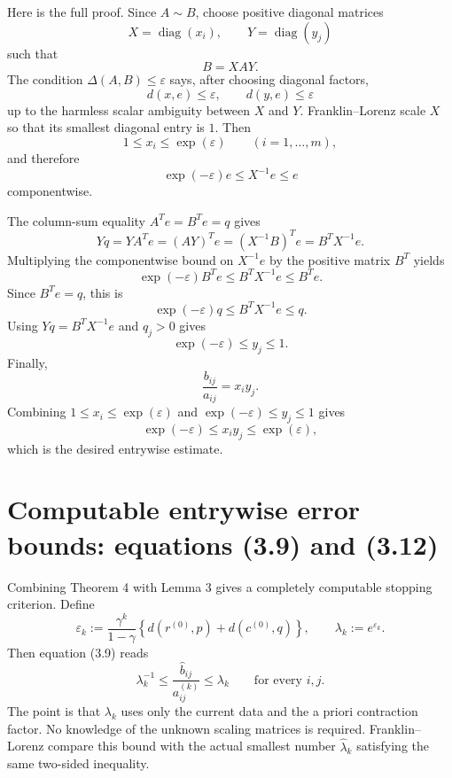 Here is the full proof.
Since $A\sim B$, choose positive diagonal matrices
\[
  X=\operatorname{diag}(x_i),\qquad Y=\operatorname{diag}(y_j)
\]
such that
\[
  B=XAY.
\]
The condition $\Delta(A,B)\le \varepsilon$ says, after choosing diagonal factors,
\[
  d(x,e)\le \varepsilon,
  \qquad
  d(y,e)\le \varepsilon
\]
up to the harmless scalar ambiguity between $X$ and $Y$.  Franklin--Lorenz scale
$X$ so that its smallest diagonal entry is $1$.  Then
\[
  1\le x_i\le \exp(\varepsilon)
  \qquad(i=1,\dots,m),
\]
and therefore
\[
  \exp(-\varepsilon)e\le X^{-1}e\le e
\]
componentwise.

The column-sum equality $A^Te=B^Te=q$ gives
\[
  Yq=YA^Te=(AY)^Te=(X^{-1}B)^Te=B^TX^{-1}e.
\]
Multiplying the componentwise bound on $X^{-1}e$ by the positive matrix $B^T$ yields
\[
  \exp(-\varepsilon)B^Te
  \le B^TX^{-1}e
  \le B^Te.
\]
Since $B^Te=q$, this is
\[
  \exp(-\varepsilon)q\le B^TX^{-1}e\le q.
\]
Using $Yq=B^TX^{-1}e$ and $q_j>0$ gives
\[
  \exp(-\varepsilon)\le y_j\le 1.
\]
Finally,
\[
  \frac{b_{ij}}{a_{ij}}=x_i y_j.
\]
Combining $1\le x_i\le \exp(\varepsilon)$ and
$\exp(-\varepsilon)\le y_j\le 1$ gives
\[
  \exp(-\varepsilon)\le x_i y_j\le \exp(\varepsilon),
\]
which is the desired entrywise estimate.


\section*{Computable entrywise error bounds: equations (3.9) and (3.12)}
Combining Theorem 4 with Lemma 3 gives a completely computable stopping
criterion.  Define
\[
  \varepsilon_k:=
  \frac{\gamma^k}{1-\gamma}
  \left\{d(r^{(0)},p)+d(c^{(0)},q)\right\},
  \qquad
  \lambda_k:=e^{\varepsilon_k}.
  \tag{3.12}
\]
Then equation (3.9) reads
\[
  \lambda_k^{-1}
  \le \frac{\widehat b_{ij}}{a^{(k)}_{ij}}
  \le \lambda_k
  \qquad\text{for every }i,j.
  \tag{3.9}
\]
The point is that $\lambda_k$ uses only the current data and the a priori
contraction factor.  No knowledge of the unknown scaling matrices is required.
Franklin--Lorenz compare this bound with the actual smallest number
$\widehat\lambda_k$ satisfying the same two-sided inequality.

